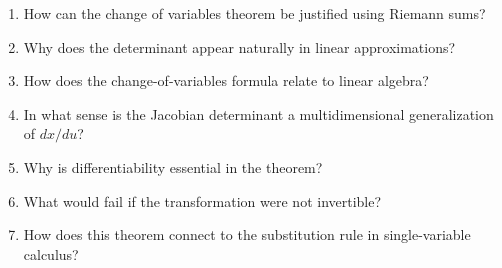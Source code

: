 \begin{enumerate}[resume]
  \item How can the change of variables theorem be justified using Riemann sums?
  \item Why does the determinant appear naturally in linear approximations?
  \item How does the change-of-variables formula relate to linear algebra?
  \item In what sense is the Jacobian determinant a multidimensional generalization of $dx/du$?
  \item Why is differentiability essential in the theorem?
  \item What would fail if the transformation were not invertible?
  \item How does this theorem connect to the substitution rule in single-variable calculus?
\end{enumerate}
